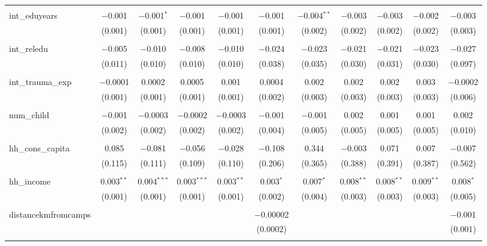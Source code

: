\begin{table}[H]
\begin{tabular}{@{\extracolsep{4pt}}lcccccccccc}
  & & & & & & & & & & \\ 
 int\_eduyears & $-$0.001 & $-$0.001$^{*}$ & $-$0.001 & $-$0.001 & $-$0.001 & $-$0.004$^{**}$ & $-$0.003 & $-$0.003 & $-$0.002 & $-$0.003 \\ 
  & (0.001) & (0.001) & (0.001) & (0.001) & (0.001) & (0.002) & (0.002) & (0.002) & (0.002) & (0.003) \\ 
  & & & & & & & & & & \\ 
 int\_reledu & $-$0.005 & $-$0.010 & $-$0.008 & $-$0.010 & $-$0.024 & $-$0.023 & $-$0.021 & $-$0.021 & $-$0.023 & $-$0.027 \\ 
  & (0.011) & (0.010) & (0.010) & (0.010) & (0.038) & (0.035) & (0.030) & (0.031) & (0.030) & (0.097) \\ 
  & & & & & & & & & & \\ 
 int\_trauma\_exp & $-$0.0001 & 0.0002 & 0.0005 & 0.001 & 0.0004 & 0.002 & 0.002 & 0.002 & 0.003 & $-$0.0002 \\ 
  & (0.001) & (0.001) & (0.001) & (0.001) & (0.002) & (0.003) & (0.003) & (0.003) & (0.003) & (0.006) \\ 
  & & & & & & & & & & \\ 
 num\_child & $-$0.001 & $-$0.0003 & $-$0.0002 & $-$0.0003 & $-$0.001 & $-$0.001 & 0.002 & 0.001 & 0.001 & 0.002 \\ 
  & (0.002) & (0.002) & (0.002) & (0.002) & (0.004) & (0.005) & (0.005) & (0.005) & (0.005) & (0.010) \\ 
  & & & & & & & & & & \\ 
 hh\_cons\_capita & 0.085 & $-$0.081 & $-$0.056 & $-$0.028 & $-$0.108 & 0.344 & $-$0.003 & 0.071 & 0.007 & $-$0.007 \\ 
  & (0.115) & (0.111) & (0.109) & (0.110) & (0.206) & (0.365) & (0.388) & (0.391) & (0.387) & (0.562) \\ 
  & & & & & & & & & & \\ 
 hh\_income & 0.003$^{**}$ & 0.004$^{***}$ & 0.003$^{***}$ & 0.003$^{**}$ & 0.003$^{*}$ & 0.007$^{*}$ & 0.008$^{**}$ & 0.008$^{**}$ & 0.009$^{**}$ & 0.008$^{*}$ \\ 
  & (0.001) & (0.001) & (0.001) & (0.001) & (0.002) & (0.004) & (0.003) & (0.003) & (0.003) & (0.005) \\ 
  & & & & & & & & & & \\ 
 distancekmfromcamps &  &  &  &  & $-$0.00002 &  &  &  &  & $-$0.001 \\ 
  &  &  &  &  & (0.0002) &  &  &  &  & (0.001) \\ 
  & & & & & & & & & & \\ 

\end{tabular}
\end{table}
